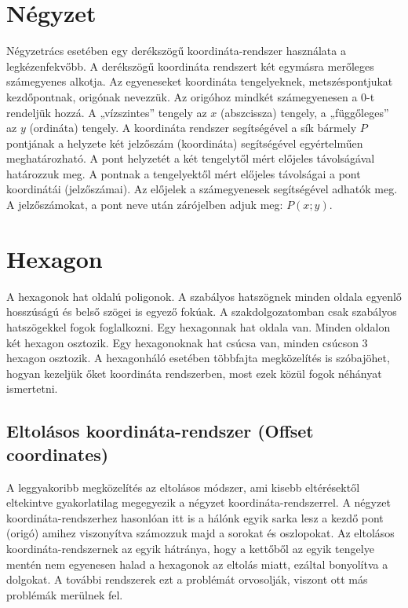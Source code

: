 
\section{Négyzet}

Négyzetrács esetében egy derékszögű koordináta-rendszer használata a legkézenfekvőbb. 
\newline
\newline A derékszögű koordináta rendszert két egymásra merőleges számegyenes alkotja. Az egyeneseket koordináta tengelyeknek, metszéspontjukat kezdőpontnak, origónak nevezzük. Az origóhoz mindkét számegyenesen a $0$-t rendeljük hozzá. A „vízszintes” tengely az $x$ (abszcissza) tengely, a „függőleges” az $y$ (ordináta) tengely.
\newline
\newline A koordináta rendszer segítségével a sík bármely $P$ pontjának a helyzete két jelzőszám (koordináta) segítségével egyértelműen meghatározható. A pont helyzetét a két tengelytől mért előjeles távolságával határozzuk meg. A pontnak a tengelyektől mért előjeles távolságai a pont koordinátái (jelzőszámai). Az előjelek a számegyenesek segítségével adhatók meg. A jelzőszámokat, a pont neve után zárójelben adjuk meg: $P(x;y)$.

\section{Hexagon}

A hexagonok hat oldalú poligonok. A szabályos hatszögnek minden oldala egyenlő hosszúságú és belső szögei is egyező fokúak. A szakdolgozatomban csak szabályos hatszögekkel fogok foglalkozni. 
\newline
\newline Egy hexagonnak hat oldala van. Minden oldalon két hexagon osztozik. Egy hexagonoknak hat csúcsa van, minden csúcson 3 hexagon osztozik.
\newline
\newline A hexagonháló esetében többfajta megközelítés is szóbajöhet, hogyan kezeljük őket koordináta rendszerben, most ezek közül fogok néhányat ismertetni. 

\subsection{Eltolásos koordináta-rendszer (Offset coordinates)}

A leggyakoribb megközelítés az eltolásos módszer, ami kisebb eltérésektől eltekintve gyakorlatilag megegyezik a négyzet koordináta-rendszerrel. 
\newline
\newline A négyzet koordináta-rendszerhez hasonlóan itt is a hálónk egyik sarka lesz a kezdő pont (origó) amihez viszonyítva számozzuk majd a sorokat és oszlopokat.
\newline
\newline Az eltolásos koordináta-rendszernek az egyik hátránya, hogy a kettőből az egyik tengelye mentén nem egyenesen halad a hexagonok az eltolás miatt, ezáltal bonyolítva a dolgokat. A további rendszerek ezt a problémát orvosolják, viszont ott más problémák merülnek fel.	

